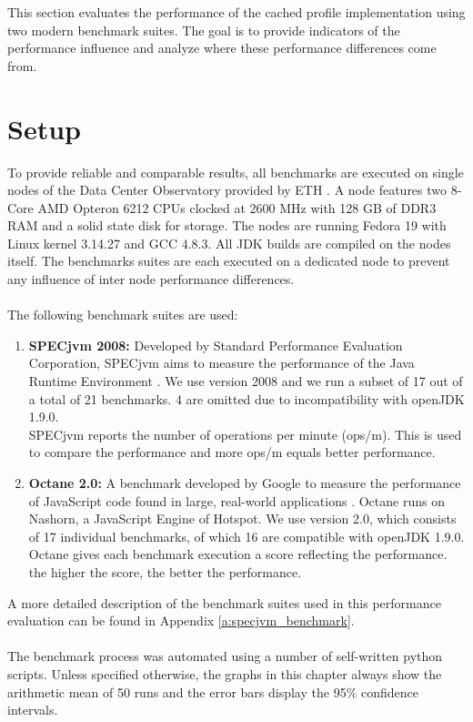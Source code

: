 This section evaluates the performance of the cached profile implementation using two modern benchmark suites. The goal is to provide indicators of the performance influence and analyze where these performance differences come from.
\section{Setup}
\label{s:perf_setup}
To provide reliable and comparable results, all benchmarks are executed on single nodes of the Data Center Observatory provided by ETH \cite{ethdco}.
A node features two 8-Core AMD Opteron 6212 CPUs clocked at 2600 MHz with 128 GB of DDR3 RAM and a solid state disk for storage.
The nodes are running Fedora 19 with Linux kernel 3.14.27 and GCC 4.8.3. All JDK builds are compiled on the nodes itself. The benchmarks suites are each executed on a dedicated node to prevent any influence of inter node performance differences.
\\\\
The following benchmark suites are used:
\begin{enumerate}
  \item \textbf{SPECjvm 2008:} Developed by Standard Performance Evaluation Corporation, SPECjvm aims to measure the performance of the Java Runtime Environment \cite{specjvm}.  We use version 2008 and we run a subset of 17 out of a total of 21 benchmarks. 4 are omitted due to incompatibility with openJDK 1.9.0.
  \\
  SPECjvm reports the number of operations per minute (ops/m). This is used to compare the performance and more ops/m equals better performance.
  \item \textbf{Octane 2.0:} A benchmark developed by Google to measure the performance of JavaScript code found in large, real-world applications \cite{octane}. Octane runs on Nashorn, a JavaScript Engine of Hotspot. We use version 2.0, which consists of 17 individual benchmarks, of which 16 are compatible with openJDK 1.9.0. 
  \\
  Octane gives each benchmark execution a score reflecting the performance. the higher the score, the better the performance.
\end{enumerate}
A more detailed description of the benchmark suites used in this performance evaluation can be found in Appendix \ref{a:specjvm_benchmark}.
\\\\
The benchmark process was automated using a number of self-written python scripts. Unless specified otherwise, the graphs in this chapter always show the arithmetic mean of 50 runs and the error bars display the 95\% confidence intervals.

